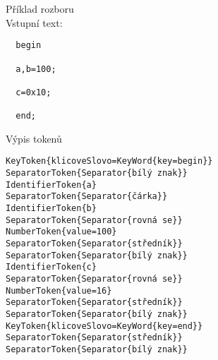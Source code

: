 Příklad rozboru\\

Vstupní text:

\begin{verbatim}
  begin 
  
  a,b=100;
  
  c=0x10;
  
  end;
\end{verbatim}

Výpis tokenů
\begin{verbatim}
KeyToken{klicoveSlovo=KeyWord{key=begin}}
SeparatorToken{Separator{bílý znak}}
IdentifierToken{a}
SeparatorToken{Separator{čárka}}
IdentifierToken{b}
SeparatorToken{Separator{rovná se}}
NumberToken{value=100}
SeparatorToken{Separator{středník}}
SeparatorToken{Separator{bílý znak}}
IdentifierToken{c}
SeparatorToken{Separator{rovná se}}
NumberToken{value=16}
SeparatorToken{Separator{středník}}
SeparatorToken{Separator{bílý znak}}
KeyToken{klicoveSlovo=KeyWord{key=end}}
SeparatorToken{Separator{středník}}
SeparatorToken{Separator{bílý znak}}
\end{verbatim}


